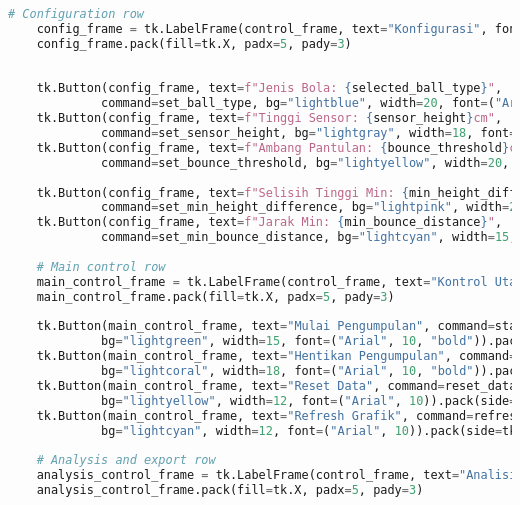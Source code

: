 \begin{itemize}
\begin{scriptsize}
\begin{lstlisting}[language=python]
    # Configuration row
    config_frame = tk.LabelFrame(control_frame, text="Konfigurasi", font=("Arial", 11, "bold"))
    config_frame.pack(fill=tk.X, padx=5, pady=3)
    
    
    tk.Button(config_frame, text=f"Jenis Bola: {selected_ball_type}", 
             command=set_ball_type, bg="lightblue", width=20, font=("Arial", 10, "bold")).pack(side=tk.LEFT, padx=3, pady=3)
    tk.Button(config_frame, text=f"Tinggi Sensor: {sensor_height}cm", 
             command=set_sensor_height, bg="lightgray", width=18, font=("Arial", 10)).pack(side=tk.LEFT, padx=3, pady=3)
    tk.Button(config_frame, text=f"Ambang Pantulan: {bounce_threshold}cm", 
             command=set_bounce_threshold, bg="lightyellow", width=20, font=("Arial", 10)).pack(side=tk.LEFT, padx=3, pady=3)
        
    tk.Button(config_frame, text=f"Selisih Tinggi Min: {min_height_difference}cm", 
             command=set_min_height_difference, bg="lightpink", width=20, font=("Arial", 10)).pack(side=tk.LEFT, padx=3, pady=3)
    tk.Button(config_frame, text=f"Jarak Min: {min_bounce_distance}", 
             command=set_min_bounce_distance, bg="lightcyan", width=15, font=("Arial", 10)).pack(side=tk.LEFT, padx=3, pady=3)
    
    # Main control row
    main_control_frame = tk.LabelFrame(control_frame, text="Kontrol Utama", font=("Arial", 11, "bold"))
    main_control_frame.pack(fill=tk.X, padx=5, pady=3)
    
    tk.Button(main_control_frame, text="Mulai Pengumpulan", command=start_collection, 
             bg="lightgreen", width=15, font=("Arial", 10, "bold")).pack(side=tk.LEFT, padx=3, pady=3)
    tk.Button(main_control_frame, text="Hentikan Pengumpulan", command=stop_collection, 
             bg="lightcoral", width=18, font=("Arial", 10, "bold")).pack(side=tk.LEFT, padx=3, pady=3)
    tk.Button(main_control_frame, text="Reset Data", command=reset_data, 
             bg="lightyellow", width=12, font=("Arial", 10)).pack(side=tk.LEFT, padx=3, pady=3)
    tk.Button(main_control_frame, text="Refresh Grafik", command=refresh_plot_manually, 
             bg="lightcyan", width=12, font=("Arial", 10)).pack(side=tk.LEFT, padx=3, pady=3)
    
    # Analysis and export row
    analysis_control_frame = tk.LabelFrame(control_frame, text="Analisis & Ekspor", font=("Arial", 11, "bold"))
    analysis_control_frame.pack(fill=tk.X, padx=5, pady=3)
    

\end{lstlisting}
\end{scriptsize}
\end{itemize}
